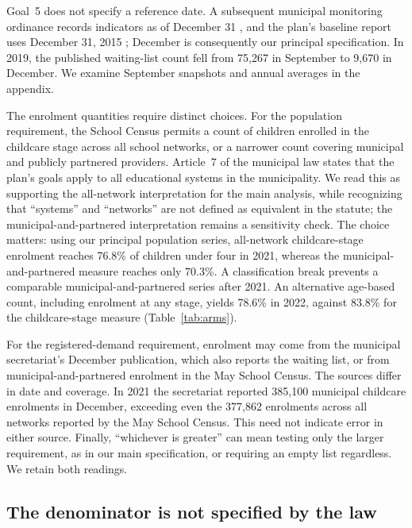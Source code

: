 Goal~5 does not specify a reference date. A subsequent municipal monitoring ordinance records indicators as of December 31 \citep{sme2016portaria7972}, and the plan's baseline report uses December 31, 2015 \citep{sme2016linhabase}; December is consequently our principal specification. In 2019, the published waiting-list count fell from 75,267 in September to 9,670 in December. We examine September snapshots and annual averages in the appendix.

The enrolment quantities require distinct choices. For the population requirement, the School Census permits a count of children enrolled in the childcare stage across all school networks, or a narrower count covering municipal and publicly partnered providers. Article~7 of the municipal law states that the plan's goals apply to all educational systems in the municipality. We read this as supporting the all-network interpretation for the main analysis, while recognizing that ``systems'' and ``networks'' are not defined as equivalent in the statute; the municipal-and-partnered interpretation remains a sensitivity check. The choice matters: using our principal population series, all-network childcare-stage enrolment reaches 76.8\% of children under four in 2021, whereas the municipal-and-partnered measure reaches only 70.3\%. A classification break prevents a comparable municipal-and-partnered series after 2021. An alternative age-based count, including enrolment at any stage, yields 78.6\% in 2022, against 83.8\% for the childcare-stage measure (Table~\ref{tab:arms}).

For the registered-demand requirement, enrolment may come from the municipal secretariat's December publication, which also reports the waiting list, or from municipal-and-partnered enrolment in the May School Census. The sources differ in date and coverage. In 2021 the secretariat reported 385,100 municipal childcare enrolments in December, exceeding even the 377,862 enrolments across all networks reported by the May School Census. This need not indicate error in either source. Finally, ``whichever is greater'' can mean testing only the larger requirement, as in our main specification, or requiring an empty list regardless. We retain both readings.

\subsection{The denominator is not specified by the law}

